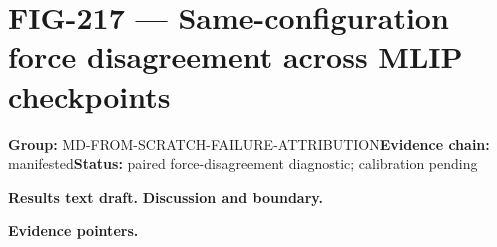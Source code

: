 \clearpage
\section{FIG-217 --- Same-configuration force disagreement across MLIP checkpoints}
\label{figpage:fig-217}
\textbf{Group:} MD-FROM-SCRATCH-FAILURE-ATTRIBUTION\quad \textbf{Evidence chain:} manifested\quad \textbf{Status:} paired force-disagreement diagnostic; calibration pending

\textbf{Results text draft.} 
\textbf{Discussion and boundary.} 


\textbf{Evidence pointers.}



\vfill
